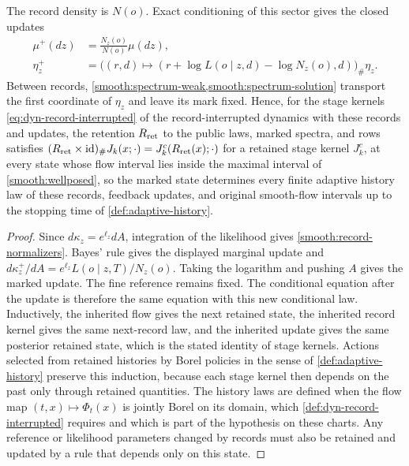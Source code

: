 The record density is $N(o)$. Exact conditioning of this sector gives the closed updates
\begin{equation}
 \begin{aligned}
 \mu^+(dz)&=\frac{N_z(o)}{N(o)}\mu(dz),\\
 \eta_z^+&=\bigl((r,d)\mapsto
       (r+\log L(o\mid z,d)-\log N_z(o),d)\bigr)_\#\eta_z.
 \end{aligned}
 \label{smooth:feedback-update}
\end{equation}
Between records, \cref{smooth:spectrum-weak,smooth:spectrum-solution} transport the first coordinate of $\eta_z$ and leave its mark fixed. Hence, for the stage kernels \cref{eq:dyn-record-interrupted} of the record-interrupted dynamics with these records and updates, the retention $R_{\rm ret}$ to the public laws, marked spectra, and rows satisfies $(R_{\rm ret}\times\mathrm{id})_\#J_k(x;\cdot)=J^c_k(R_{\rm ret}(x);\cdot)$ for a retained stage kernel $J^c_k$, at every state whose flow interval lies inside the maximal interval of \cref{smooth:wellposed}, so the marked state determines every finite adaptive history law of these records, feedback updates, and original smooth-flow intervals up to the stopping time of \cref{def:adaptive-history}.
\begin{proof}
Since $d\kappa_z=e^{\ell_z}dA$, integration of the likelihood gives \cref{smooth:record-normalizers}. Bayes' rule gives the displayed marginal update and
$d\kappa_z^+/dA=e^{\ell_z}L(o\mid z,T)/N_z(o)$. Taking the logarithm and pushing $A$ gives the marked update. The fine reference remains fixed. The conditional equation after the update is therefore the same equation with this new conditional law. Inductively, the inherited flow gives the next retained state, the inherited record kernel gives the same next-record law, and the inherited update gives the same posterior retained state, which is the stated identity of stage kernels. Actions selected from retained histories by Borel policies in the sense of \cref{def:adaptive-history} preserve this induction, because each stage kernel then depends on the past only through retained quantities. The history laws are defined when the flow map $(t,x)\mapsto\Phi_t(x)$ is jointly Borel on its domain, which \cref{def:dyn-record-interrupted} requires and which is part of the hypothesis on these charts. Any reference or likelihood parameters changed by records must also be retained and updated by a rule that depends only on this state.
\end{proof}

